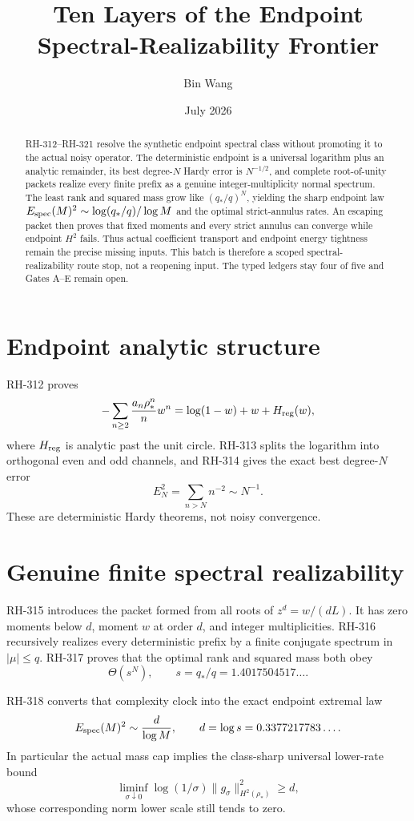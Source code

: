 \documentclass[11pt]{article}
\title{Ten Layers of the Endpoint Spectral-Realizability Frontier}
\author{Bin Wang}\date{July 2026}
\theoremstyle{remark}\newtheorem{remark}[proposition]{Remark}
\begin{document}
\maketitle
\begin{abstract}
RH-312--RH-321 resolve the synthetic endpoint spectral class without
promoting it to the actual noisy operator.  The deterministic endpoint is a
universal logarithm plus an analytic remainder, its best degree-$N$ Hardy
error is $N^{-1/2}$, and complete root-of-unity packets realize every finite
prefix as a genuine integer-multiplicity normal spectrum.  The least rank and
squared mass grow like $(q_*/q)^N$, yielding the sharp endpoint law
$E_{\rm spec}(M)^2\sim\log(q_*/q)/\log M$ and the optimal strict-annulus
rates.  An escaping packet then proves that fixed moments and every strict
annulus can converge while endpoint $H^2$ fails.  Thus actual coefficient
transport and endpoint energy tightness remain the precise missing inputs.
This batch is therefore a scoped spectral-realizability route stop, not a
reopening input.  The typed ledgers stay four of five and Gates A--E remain
open.
\end{abstract}

\section{Endpoint analytic structure}
RH-312 proves
\[
 -\sum_{n\ge2}\frac{a_n\rho_*^n}{n}w^n
 =\log(1-w)+w+H_{\rm reg}(w),
\]
where $H_{\rm reg}$ is analytic past the unit circle.  RH-313 splits the
logarithm into orthogonal even and odd channels, and RH-314 gives the exact
best degree-$N$ error
\[
 E_N^2=\sum_{n>N}n^{-2}\sim N^{-1}.
\]
These are deterministic Hardy theorems, not noisy convergence.

\section{Genuine finite spectral realizability}
RH-315 introduces the packet formed from all roots of
$z^d=w/(dL)$.  It has zero moments below $d$, moment $w$ at order $d$, and
integer multiplicities.  RH-316 recursively realizes every deterministic
prefix by a finite conjugate spectrum in $|\mu|\le q$.  RH-317 proves that
the optimal rank and squared mass both obey
\[
 \Theta(s^N),\qquad s=q_*/q=1.4017504517\ldots.
\]

RH-318 converts that complexity clock into the exact endpoint extremal law
\[
 E_{\rm spec}(M)^2\sim\frac{d}{\log M},
 \qquad d=\log s=0.3377217783\ldots.
\]
In particular the actual mass cap implies the class-sharp universal
lower-rate bound
\[
 \liminf_{\sigma\downarrow0}\log(1/\sigma)
 \|g_\sigma\|_{H^2(\rho_*)}^2\ge d,
\]
whose corresponding norm lower scale still tends to zero.
\end{document}

